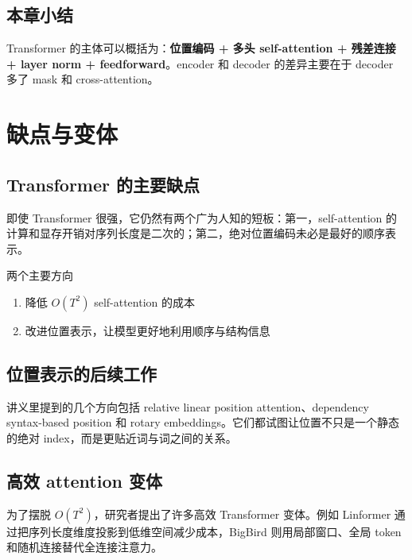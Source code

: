 \documentclass[a4paper]{article}
\begin{document}
\subsection{本章小结}

Transformer 的主体可以概括为：\textbf{位置编码 + 多头 self-attention + 残差连接 + layer norm + feedforward}。encoder 和 decoder 的差异主要在于 decoder 多了 mask 和 cross-attention。


\section{缺点与变体}

\subsection{Transformer 的主要缺点}

即使 Transformer 很强，它仍然有两个广为人知的短板：第一，self-attention 的计算和显存开销对序列长度是二次的；第二，绝对位置编码未必是最好的顺序表示。





\begin{importantbox}{两个主要方向}
\begin{enumerate}
    \item 降低 $O(T^2)$ self-attention 的成本
    \item 改进位置表示，让模型更好地利用顺序与结构信息
\end{enumerate}
\end{importantbox}

\subsection{位置表示的后续工作}

讲义里提到的几个方向包括 relative linear position attention、dependency syntax-based position 和 rotary embeddings。它们都试图让位置不只是一个静态的绝对 index，而是更贴近词与词之间的关系。





\subsection{高效 attention 变体}

为了摆脱 $O(T^2)$，研究者提出了许多高效 Transformer 变体。例如 Linformer 通过把序列长度维度投影到低维空间减少成本，BigBird 则用局部窗口、全局 token 和随机连接替代全连接注意力。
\end{document}
